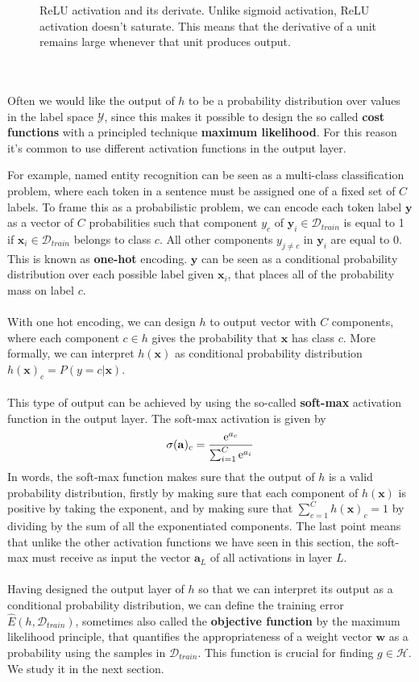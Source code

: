 \begin{figure}
	\centering
	
	\caption{ReLU activation and its derivate. Unlike sigmoid activation, ReLU activation doesn't saturate. This means that the derivative of a unit remains large whenever that unit produces output.}
	\label{relu}
\end{figure}
\\\\
Often we would like the output of $h$ to be a probability distribution over values in the label space $\mathcal{Y}$, since this makes it possible to design the so called \textbf{cost functions} with a principled technique \textbf{maximum likelihood}. For this reason it's common to use different activation functions in the output layer. 

For example, named entity recognition can be seen as a multi-class classification problem, where each token in a sentence must be assigned one of a fixed set of $C$ labels. To frame this as a probabilistic problem, we can encode each token label $\mathbf{y}$ as a vector of $C$ probabilities such that component $y_c$ of $\mathbf{y}_i \in \mathcal{D}_{train}$ is equal to 1 if $\mathbf{x}_i \in \mathcal{D}_{train}$ belongs to class $c$. All other components $y_{j\neq c}$ in $\mathbf{y}_i$ are equal to 0. This is known as \textbf{one-hot} encoding. $\mathbf{y}$ can be seen as a conditional probability distribution over each possible label given $\mathbf{x}_i$, that places all of the probability mass on label $c$.
\\\\
With one hot encoding, we can design $h$ to output vector with $C$ components, where each component $c \in h$ gives the probability that $\mathbf{x}$ has class $c$. More formally, we can interpret $h(\mathbf{x})$ as conditional probability distribution $h(\mathbf{x})_c = P(y = c | \mathbf{x})$.
\\\\
This type of output can be achieved by using the so-called \textbf{soft-max} activation function in the output layer. The soft-max activation is given by 
$$
\sigma(\mathbf{a})_c = \frac{\mathrm{e}^{a_c}}{\sum_{i = 1}^C \mathrm{e}^{a_i}}
$$ 
In words, the soft-max function makes sure that the output of $h$ is a valid probability distribution, firstly by making sure that each component of $h(\mathbf{x})$ is positive by taking the exponent, and by making sure that $\sum_{c=1}^Ch(\mathbf{x})_c = 1$ by dividing by the sum of all the exponentiated components. The last point means that unlike the other activation functions we have seen in this section, the soft-max must receive as input the vector $\mathbf{a}_L$ of all activations in layer $L$.
\\\\
Having designed the output layer of $h$ so that we can interpret its output as a conditional probability distribution, we can define the training error $\hat{E}(h, \mathcal{D}_{train})$, sometimes also called the \textbf{objective function} by the maximum likelihood principle, that quantifies the appropriateness of a weight vector $\mathbf{w}$ as a probability using the samples in $\mathcal{D}_{train}$. This function is crucial for finding $g \in \mathcal{H}$. We study it in the next section.

